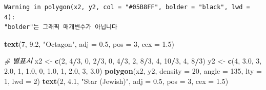 \documentclass[
  11pt,
]{krantz}
\newenvironment{Shaded}{\begin{snugshade}}{\end{snugshade}}
\newcommand{\CommentTok}[1]{\textcolor[rgb]{0.37,0.37,0.37}{\textit{#1}}}
\newcommand{\DataTypeTok}[1]{\textcolor[rgb]{0.27,0.27,0.27}{#1}}
\newcommand{\DecValTok}[1]{\textcolor[rgb]{0.06,0.06,0.06}{#1}}
\newcommand{\FloatTok}[1]{\textcolor[rgb]{0.06,0.06,0.06}{#1}}
\newcommand{\KeywordTok}[1]{\textcolor[rgb]{0.27,0.27,0.27}{\textbf{#1}}}
\newcommand{\NormalTok}[1]{#1}
\newcommand{\OperatorTok}[1]{\textcolor[rgb]{0.43,0.43,0.43}{\textbf{#1}}}
\newcommand{\StringTok}[1]{\textcolor[rgb]{0.5,0.5,0.5}{#1}}
\begin{document}
\begin{verbatim}
Warning in polygon(x2, y2, col = "#05B8FF", bolder = "black", lwd = 4):
"bolder"는 그래픽 매개변수가 아닙니다
\end{verbatim}

\begin{Shaded}
\begin{Highlighting}[]
\KeywordTok{text}\NormalTok{(}\DecValTok{7}\NormalTok{, }\FloatTok{9.2}\NormalTok{, }\StringTok{"Octagon"}\NormalTok{, }\DataTypeTok{adj =} \FloatTok{0.5}\NormalTok{, }\DataTypeTok{pos =} \DecValTok{3}\NormalTok{, }\DataTypeTok{cex =} \FloatTok{1.5}\NormalTok{)}

\CommentTok{# 별표시}
\NormalTok{x2 <-}\StringTok{ }\KeywordTok{c}\NormalTok{(}\DecValTok{2}\NormalTok{, }\DecValTok{4}\OperatorTok{/}\DecValTok{3}\NormalTok{, }\DecValTok{0}\NormalTok{, }\DecValTok{2}\OperatorTok{/}\DecValTok{3}\NormalTok{, }\DecValTok{0}\NormalTok{, }\DecValTok{4}\OperatorTok{/}\DecValTok{3}\NormalTok{, }\DecValTok{2}\NormalTok{, }\DecValTok{8}\OperatorTok{/}\DecValTok{3}\NormalTok{, }\DecValTok{4}\NormalTok{, }\DecValTok{10}\OperatorTok{/}\DecValTok{3}\NormalTok{, }\DecValTok{4}\NormalTok{, }\DecValTok{8}\OperatorTok{/}\DecValTok{3}\NormalTok{)}
\NormalTok{y2 <-}\StringTok{ }\KeywordTok{c}\NormalTok{(}\DecValTok{4}\NormalTok{, }\FloatTok{3.0}\NormalTok{, }\DecValTok{3}\NormalTok{, }\FloatTok{2.0}\NormalTok{, }\DecValTok{1}\NormalTok{, }\FloatTok{1.0}\NormalTok{, }\DecValTok{0}\NormalTok{, }\FloatTok{1.0}\NormalTok{, }\DecValTok{1}\NormalTok{,  }\FloatTok{2.0}\NormalTok{, }\DecValTok{3}\NormalTok{, }\FloatTok{3.0}\NormalTok{)}
\KeywordTok{polygon}\NormalTok{(x2, y2,}
        \DataTypeTok{density =} \DecValTok{20}\NormalTok{,}
        \DataTypeTok{angle =} \DecValTok{135}\NormalTok{,}
        \DataTypeTok{lty =} \DecValTok{1}\NormalTok{,}
        \DataTypeTok{lwd =} \DecValTok{2}\NormalTok{)}
\KeywordTok{text}\NormalTok{(}\DecValTok{2}\NormalTok{, }\FloatTok{4.1}\NormalTok{, }\StringTok{"Star (Jewish)"}\NormalTok{, }\DataTypeTok{adj =} \FloatTok{0.5}\NormalTok{, }\DataTypeTok{pos =} \DecValTok{3}\NormalTok{, }\DataTypeTok{cex =} \FloatTok{1.5}\NormalTok{)}


\end{Highlighting}
\end{Shaded}
\end{document}
